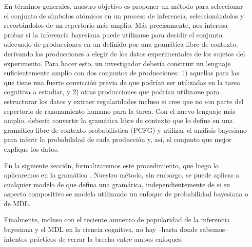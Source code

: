 En términos generales, nuestro objetivo es proponer un método para seleccionar el conjunto de símbolos atómicos en un proceso de inferencia, seleccionándolos y recortándolos de un repertorio más amplio. Más precisamente, nos interesa probar si la inferencia bayesiana puede utilizarse para decidir el conjunto adecuado de producciones en un \lot definido por una gramática libre de contexto, derivando las producciones a elegir de los datos experimentales de los sujetos del experimento. Para hacer esto, un investigador debería construir un lenguaje suficientemente amplio con dos conjuntos de producciones: 1) aquellas para las que tiene una fuerte convicción previa de que podrían ser utilizadas en la tarea cognitiva a estudiar, y 2) otras producciones que podrían utilizarse para estructurar los datos y extraer regularidades incluso si cree que no son parte del repertorio de razonamiento humano para la tarea. Con el nuevo lenguaje más amplio, debería convertir la gramática libre de contexto que lo define en una gramática libre de contexto probabilística (PCFG) y utilizar el análisis bayesiano para inferir la probabilidad de cada producción y, así, el conjunto que mejor explique los datos.


En la siguiente sección, formalizaremos este procedimiento, que luego lo aplicaremos en la gramática \gramgeo. Nuestro método, sin embargo, se puede aplicar a cualquier modelo de \lot que defina una gramática, independientemente de si su aspecto compositivo se modela utilizando un enfoque de probabilidad bayesiana o de MDL.


Finalmente, incluso con el reciente aumento de popularidad de la inferencia bayesiana y el MDL en la ciencia cognitiva, no hay --hasta donde sabemos-- intentos prácticos de cerrar la brecha entre ambos enfoques.

